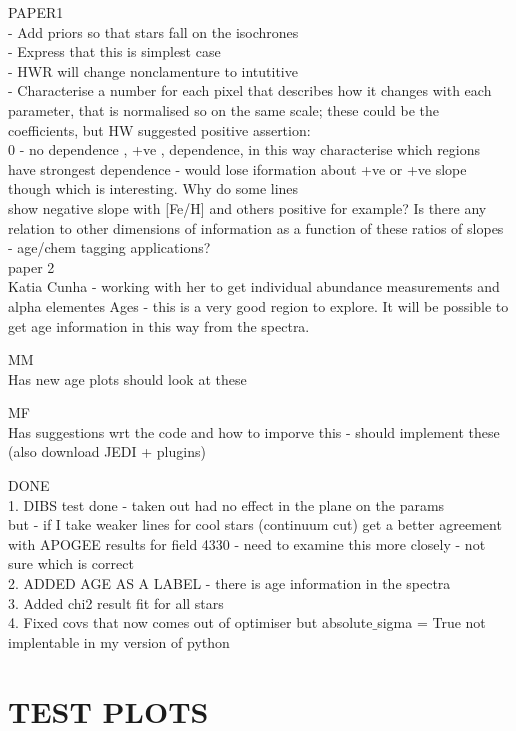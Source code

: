 \documentclass[12pt, preprint]{aastex}
\begin{document}
PAPER1 \\
- Add priors so that stars fall on the isochrones\\
- Express that this is simplest case\\
- HWR will change nonclamenture to intutitive\\
- Characterise a number for each pixel that describes how it changes with each parameter, that is normalised so on the same scale; these could be the coefficients, but HW suggested positive assertion:\\
0 - no dependence , +ve , dependence, in this way characterise which regions have strongest dependence - would lose iformation about +ve or +ve slope though which is interesting. Why do some lines\\
show negative slope with [Fe/H] and others positive for example? Is there any relation to other dimensions of information as a function of these ratios of slopes - age/chem tagging applications?\\

paper 2 \\
Katia Cunha - working with her to get individual abundance measurements and alpha elementes
Ages - this is a very good region to explore. It will be possible to get age information in this way from the spectra.

MM \\
Has new age plots should look at these

MF \\
Has suggestions wrt the code and how to imporve this - should implement these (also download JEDI + plugins)

DONE \\
1. DIBS test done - taken out had no effect in the plane on the params\\
but - if I take weaker lines for cool stars (continuum cut) get a better agreement with APOGEE results for field 4330 - need to examine this more closely - not sure which is correct\\
2. ADDED AGE AS A LABEL - there is age information in the spectra\\
3. Added chi2 result fit for all stars\\
4. Fixed covs that now comes out of optimiser but absolute$\_$sigma = True not implentable in my version of python\\

\section{TEST PLOTS} 
\end{document}

